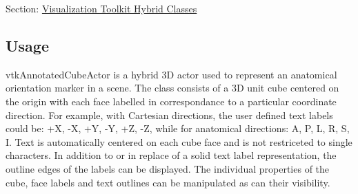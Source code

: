 Section\-: \hyperlink{sec_vtkhybrid}{Visualization Toolkit Hybrid Classes} \hypertarget{vtkwidgets_vtkxyplotwidget_Usage}{}\subsection{Usage}\label{vtkwidgets_vtkxyplotwidget_Usage}
vtk\-Annotated\-Cube\-Actor is a hybrid 3\-D actor used to represent an anatomical orientation marker in a scene. The class consists of a 3\-D unit cube centered on the origin with each face labelled in correspondance to a particular coordinate direction. For example, with Cartesian directions, the user defined text labels could be\-: +\-X, -\/\-X, +\-Y, -\/\-Y, +\-Z, -\/\-Z, while for anatomical directions\-: A, P, L, R, S, I. Text is automatically centered on each cube face and is not restriceted to single characters. In addition to or in replace of a solid text label representation, the outline edges of the labels can be displayed. The individual properties of the cube, face labels and text outlines can be manipulated as can their visibility.

